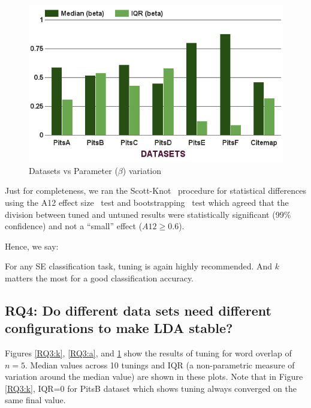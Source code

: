 \documentclass[twocolumn,5p,sort&compress]{elsarticle}
\theoremstyle{break}
\begin{document}
\begin{figure}[!t]
\begin{minipage}{.33\textwidth}
        \includegraphics[width=\linewidth]{./fig/Parameters_variation_b.png}
        \caption{Datasets vs Parameter ($\beta$) variation}
        \label{RQ3:b}
    \end{minipage}
\end{figure}

Just for completeness, we ran the Scott-Knot~\cite{jelihovschi2014scottknott} procedure for statistical differences using the A12 effect size~\cite{vargha2000critique}
test and bootstrapping~\cite{efron1994introduction} test which agreed that the division between tuned and untuned results were statistically significant (99\% confidence) and not a ``small'' effect ($A12 \ge 0.6$).

\noindent
Hence, we say:

\begin{lesson}
For any SE classification task, tuning is again highly recommended. And $k$ matters the most for a good classification accuracy.
\end{lesson}

\subsection{\textbf{RQ4: Do different data sets
      need different configurations to make LDA stable?}}
      \label{sect:diff}

Figures \ref{RQ3:k}, \ref{RQ3:a}, and \ref{RQ3:b} show the results of tuning for word overlap of $n=5$. Median values across 10 tunings and IQR (a non-parametric measure of variation
around the median value) are shown in these plots. Note that in Figure \ref{RQ3:k}, IQR=0 for  PitsB dataset which shows tuning always converged on the same final value.
\end{document}
